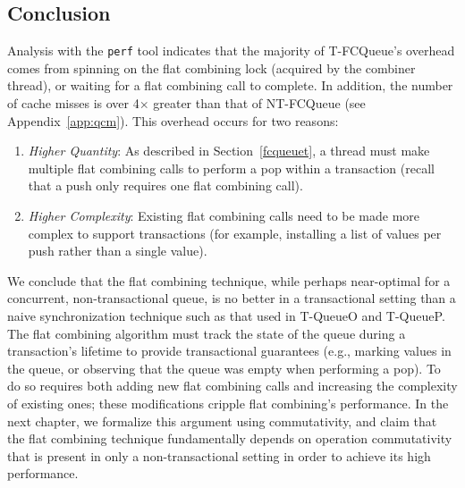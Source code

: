 \subsection{Conclusion}
Analysis with the \texttt{perf} tool indicates that the majority of T-FCQueue's overhead comes from spinning on the flat combining lock (acquired by the combiner thread), or waiting for a flat combining call to complete. In addition, the number of cache misses is over 4$\times$ greater than that of NT-FCQueue (see Appendix~\ref{app:qcm}). This overhead occurs for two reasons:
\begin{enumerate}
    \item \emph{Higher Quantity}: As described in Section~\ref{fcqueuet}, a thread must make multiple flat combining calls to perform a pop within a transaction (recall that a push only requires one flat combining call).
    \item \emph{Higher Complexity}: Existing flat combining calls need to be made more complex to support transactions (for example, installing a list of values per push rather than a single value).
\end{enumerate}

We conclude that the flat combining technique, while perhaps near-optimal for a concurrent, non-transactional queue, is no better in a transactional setting than a naive synchronization technique such as that used in T-QueueO and T-QueueP. The flat combining algorithm must track the state of the queue during a transaction's lifetime to provide transactional guarantees (e.g., marking values in the queue, or observing that the queue was empty when performing a pop). To do so requires both adding new flat combining calls and increasing the complexity of existing ones; these modifications cripple flat combining's performance.
In the next chapter, we formalize this argument using commutativity, and claim that the flat combining technique fundamentally depends on operation commutativity that is present in only a non-transactional setting in order to achieve its high performance. 
